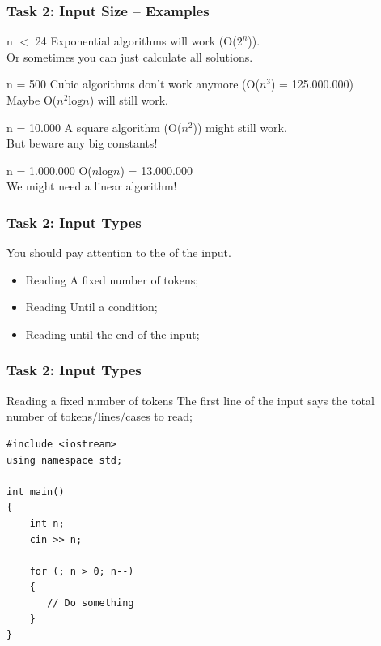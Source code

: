 \documentclass{beamer}
\begin{document}
\begin{frame}
  \frametitle{Task 2: Input Size -- Examples}

  \begin{block}{n $<$ 24}
    Exponential algorithms will work (O($2^n$)).\\
    Or sometimes you can just calculate all solutions.
  \end{block}

  \begin{block}{n = 500}
    Cubic algorithms don't work anymore (O($n^3$) = 125.000.000)\\
    Maybe O($n^2\text{log}n$) will still work.
  \end{block}

  \begin{block}{n = 10.000}
    A square algorithm (O($n^2$)) might still work.\\
    But beware any big constants!
  \end{block}

  \begin{block}{n = 1.000.000}
    O($n$log$n$) = 13.000.000\\
    We might need a linear algorithm!
  \end{block}
\end{frame}

\begin{frame}
  \frametitle{Task 2: Input Types}

  You should pay attention to the  of the
  input.

  \vfill

  \begin{itemize}
  \item Reading A fixed number of tokens;
  \item Reading Until a condition;
  \item Reading until the end of the input;
  \end{itemize}
\end{frame}

\begin{frame}[fragile]
  \frametitle{Task 2: Input Types}
  \begin{block}{Reading a fixed number of tokens}
    The first line of the input says the total number of
    tokens/lines/cases to read;
  \end{block}

{\smaller 
\begin{verbatim}
#include <iostream>
using namespace std;

int main()
{
    int n;    
    cin >> n;

    for (; n > 0; n--)
    {
       // Do something
    }    
}
\end{verbatim}}

\end{frame}
\end{document}
